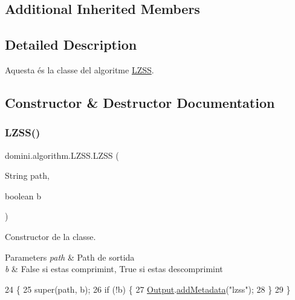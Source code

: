 \subsection*{Additional Inherited Members}


\subsection{Detailed Description}
Aquesta és la classe del algoritme \hyperlink{classdomini_1_1algorithm_1_1LZSS}{L\+Z\+SS}. 

\subsection{Constructor \& Destructor Documentation}
\mbox{\label{classdomini_1_1algorithm_1_1LZSS_a8db81d23b97e401015ec60763ef13aba}} 
\subsubsection{\texorpdfstring{L\+Z\+S\+S()}{LZSS()}\hspace{0.1cm}{\footnotesize\ttfamily [1/2]}}
{\footnotesize\ttfamily domini.\+algorithm.\+L\+Z\+S\+S.\+L\+Z\+SS (\begin{DoxyParamCaption}\item[{String}]{path,  }\item[{boolean}]{b }\end{DoxyParamCaption})\hspace{0.3cm}{\ttfamily [inline]}}



Constructor de la classe. 


\begin{DoxyParams}{Parameters}
{\em path} & Path de sortida \\
\hline
{\em b} & False si estas comprimint, True si estas descomprimint \\
\hline
\end{DoxyParams}

\begin{DoxyCode}
24                                         \{
25         super(path, b);
26         \textcolor{keywordflow}{if} (!b) \{
27             \hyperlink{classdomini_1_1algorithm_1_1Algorithm_a4de9955411c656325adc391ef570c082}{Output}.\hyperlink{classpersistencia_1_1output_1_1Ctrl__Output_ae6d6857910a023982900ddc857b891f0}{addMetadata}(\textcolor{stringliteral}{"lzss"});
28         \}
29     \}
\end{DoxyCode}
\mbox{\label{classdomini_1_1algorithm_1_1LZSS_af1d7db47ad910e8bdeffb59c2f4f1caa}} 
